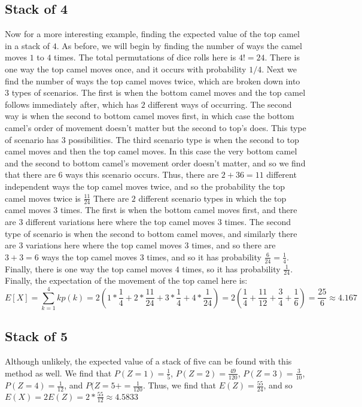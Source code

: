 \documentclass{article}
\begin{document}
\subsection{Stack of 4}
 Now for a more interesting example, finding the expected value of the top camel in a stack of $4$. As before, we will begin by finding the number of ways the camel moves $1$ to $4$ times. The total permutations of dice rolls here is $4! = 24$. There is one way the top camel moves once, and it occurs with probability $1/4$. Next we find the number of ways the top camel moves twice, which are broken down into $3$ types of scenarios.
The first is when the bottom camel moves and the top camel follows immediately after, which has $2$ different ways of occurring. The second way is when the second to bottom camel moves first, in which case the bottom camel's order of movement doesn't matter but the second to top's does. This type of scenario has $3$ possibilities. The third scenario type is when the second to top camel moves and then the top camel moves. In this case the very bottom camel and the second to bottom camel's movement order doesn't matter, and so we find that there are $6$ ways this scenario occurs. Thus, there are $2 + 3 6 = 11$ different independent ways the top camel moves twice, and so the probability the top camel moves twice is $\frac{11}{24}$ There are $2$ different scenario types in which the top camel moves $3$ times. The first is when the bottom camel moves first, and there are $3$ different variations here where the top camel moves $3$ times. The second type of scenario is when the second to bottom camel moves, and similarly there are $3$ variations here where the top camel moves $3$ times, and so there are $3 + 3 = 6$ ways the top camel moves $3$ times, and so it has probability $\frac{6}{24} = \frac{1}{4}$. Finally, there is one way the top camel moves $4$ times, so it has probability $\frac{1}{24}$. Finally, the expectation of the movement of the top camel here is:
$$E[X]=\sum_{k=1}^4 kp(k) = 2(1*\frac{1}{4} + 2*\frac{11}{24} + 3*\frac{1}{4} + 4*\frac{1}{24}) = 2(\frac{1}{4}+\frac{11}{12}+\frac{3}{4}+\frac{1}{6}) = \frac{25}{6} \approx 4.167$$

\subsection{Stack of 5}
 Although unlikely, the expected value of a stack of five can be found with this method as well. We find that $P(Z=1) = \frac{1}{5}$, $P(Z=2) = \frac{49}{120}$, $P(Z=3) = \frac{3}{10}$, $P(Z=4) = \frac{1}{12}$, and $P(Z=5+ = \frac{1}{120}$. Thus, we find that $E(Z) = \frac{55}{24}$, and so $E(X) = 2E(Z) = 2*\frac{55}{12} \approx 4.5833$
\end{document}
